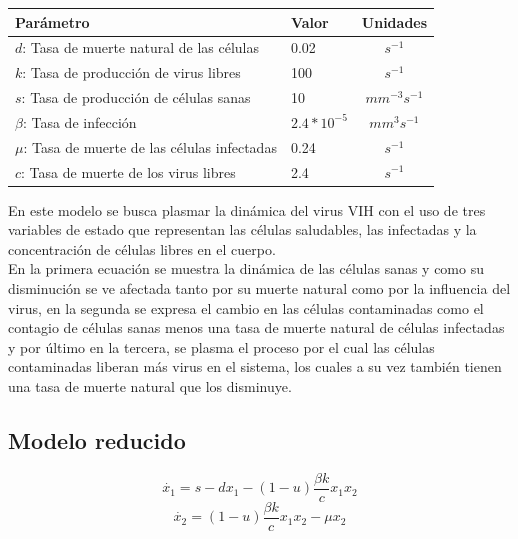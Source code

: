 \documentclass{article}
\begin{document}
    \begin{tabular}{|p{7cm} p{2cm} c|}
        \hline
        \textbf{Parámetro} & \textbf{Valor} & \textbf{Unidades} \\
        \hline
        $d$: Tasa de muerte natural de las células      & 0.02            & $s^{-1}$\\
        $k$: Tasa de producción de virus libres         & 100             & $s^{-1}$\\
        $s$: Tasa de producción de células sanas        & 10              & $mm^{-3} s^{-1}$\\
        $\beta$: Tasa de infección                      & $2.4 * 10^{-5}$ & $mm^3 s^{-1}$\\
        $\mu$: Tasa de muerte de las células infectadas & 0.24            & $s^{-1}$\\
        $c$: Tasa de muerte de los virus libres         & 2.4             & $s^{-1}$\\
        \hline
    \end{tabular}

\vspace{1cm}

En este modelo se busca plasmar la dinámica del virus VIH con el uso de tres
variables de estado que representan las células saludables, las infectadas y la
concentración de células libres en el cuerpo.\\

En la primera ecuación se muestra la dinámica de las células sanas y como su
disminución se ve afectada tanto por su muerte natural como por la influencia
del virus, en la segunda se expresa el cambio en las células
contaminadas como el contagio de células sanas menos una tasa de muerte natural
de células infectadas y por último en la tercera, se plasma el proceso
por el cual las células contaminadas liberan más virus en el sistema, los
cuales a su vez también tienen una tasa de muerte natural que los disminuye.\\

    \subsection{Modelo reducido}

    \Large
    $$\dot{x_1} = s -dx_1 - (1-u) \frac{\beta k}{c} x_1 x_2$$
    $$\dot{x_2} = (1-u) \frac{\beta k}{c} x_1 x_2 - \mu x_2$$
    \normalsize

    \vspace{0.5cm}
\end{document}
